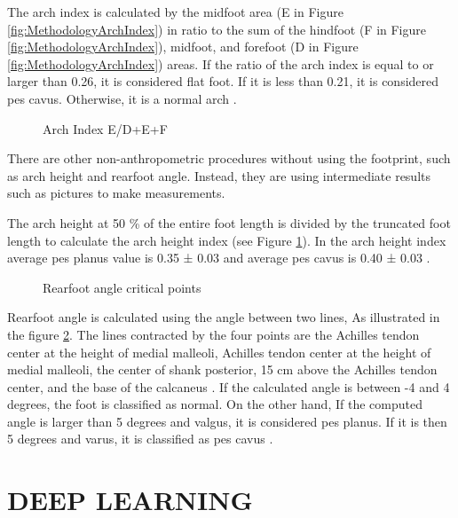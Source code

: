 The arch index is calculated by the midfoot area (E in Figure \ref{fig:MethodologyArchIndex}) in ratio to the sum of the hindfoot (F in Figure \ref{fig:MethodologyArchIndex}), midfoot, and forefoot (D in Figure \ref{fig:MethodologyArchIndex}) areas. If the ratio of the arch index is equal to or larger than 0.26, it is considered flat foot. If it is less than 0.21, it is considered pes cavus. Otherwise, it is a normal arch \cite{igbigbi2005arch}. 

\begin{figure}[htbp]
\centering
{}
\caption{Arch Index E/D+E+F \cite{miller2014effect}}
\label{fig:MethodologyArchHeightIndex}
\end{figure}

There are other non-anthropometric procedures without using the footprint, such as arch height and rearfoot angle. Instead, they are using intermediate results such as pictures to make measurements.

The arch height at 50 \% of the entire foot length is divided by the truncated foot length to calculate the arch height index (see Figure \ref{fig:MethodologyArchHeightIndex}). In the arch height index average pes planus value is 0.35 ± 0.03 and average pes cavus is 0.40 ± 0.03 \cite{hillstrom2013foot}.

\begin{figure}[htbp]
\centering
{}
\caption{Rearfoot angle critical points \cite{langley2016clinical}}
\label{fig:MethodologyRearfootAngle}
\end{figure}

Rearfoot angle is calculated using the angle between two lines, As illustrated in the figure \ref{fig:MethodologyRearfootAngle}. The lines contracted by the four points are the Achilles tendon center at the height of medial malleoli, Achilles tendon center at the height of medial malleoli, the center of shank posterior, 15 cm above the Achilles tendon center, and the base of the calcaneus \cite{huerta2008relationship}. If the calculated angle is between -4 and 4 degrees, the foot is classified as normal. On the other hand, If the computed angle is larger than 5 degrees and valgus, it is considered pes planus. If it is then 5 degrees and varus, it is classified as pes cavus \cite{jonson1997intraexaminer}.

\section{DEEP LEARNING}


